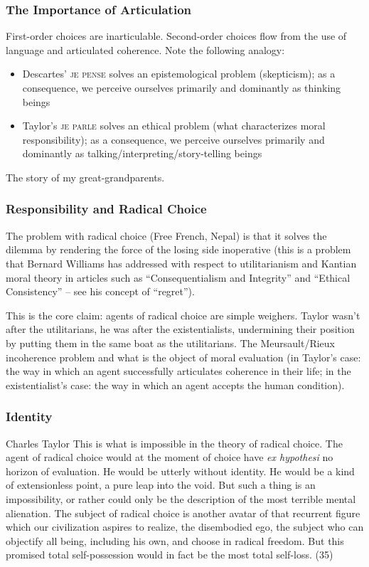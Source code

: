\documentclass[xcolor=dvipsnames]{beamer}
\begin{document}
\begin{frame}
  \frametitle{The Importance of Articulation}
  First-order choices are inarticulable. Second-order choices flow
  from the use of language and articulated coherence. Note the
  following analogy:
  \begin{itemize}
  \item Descartes' \textsc{je pense} solves an epistemological
    problem (skepticism); as a consequence, we perceive ourselves
    primarily and dominantly as thinking beings
  \item Taylor's \textsc{je parle} solves an ethical problem (what
    characterizes moral responsibility); as a consequence, we
    perceive ourselves primarily and dominantly as
    talking/interpreting/story-telling beings
  \end{itemize}
The story of my great-grandparents. 
\end{frame}

\begin{frame}
  \frametitle{Responsibility and Radical Choice}
  The problem with radical choice (Free French, Nepal) is that it
  solves the dilemma by rendering the force of the losing side
  inoperative (this is a problem that Bernard Williams has
  addressed with respect to utilitarianism and Kantian moral
  theory in articles such as ``Consequentialism and Integrity''
  and ``Ethical Consistency'' -- see his concept of ``regret'').

\bigskip

This is the core claim: agents of radical choice are simple
weighers. Taylor wasn't after the utilitarians, he was after the
existentialists, undermining their position by putting them in the
same boat as the utilitarians. The Meursault/Rieux incoherence
problem and what is the object of moral evaluation (in Taylor's
case: the way in which an agent successfully articulates coherence
in their life; in the existentialist's case: the way in which an
agent accepts the human condition).
\end{frame}

\begin{frame}
  \frametitle{Identity}
  \begin{block}{Charles Taylor}
    This is what is impossible in the theory of radical choice.
    The agent of radical choice would at the moment of choice have
    \emph{ex hypothesi} no horizon of evaluation. He would be utterly
    without identity. He would be a kind of extensionless point, a
    pure leap into the void. But such a thing is an impossibility,
    or rather could only be the description of the most terrible
    mental alienation. The subject of radical choice is another
    avatar of that recurrent figure which our civilization aspires
    to realize, the disembodied ego, the subject who can objectify
    all being, including his own, and choose in radical freedom.
    But this promised total self-possession would in fact be the
    most total self-loss. (35)
  \end{block}
\end{frame}
\end{document}
